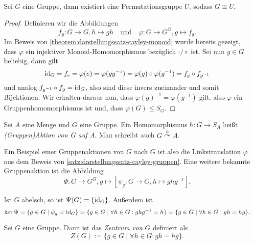 \begin{theorem}\label{satz:darstellungssatz-cayley-gruppen}
    Sei $G$ eine Gruppe, dann existiert eine Permutationsgruppe $U$, sodass $G \cong U$.
\end{theorem}
\begin{proof}
    Definieren wir die Abbildungen $$f_g: G \to G, h \mapsto gh \quad\text{und}\quad \varphi: G \to G^G, g \mapsto f_g.$$
    Im Beweis von \cref{theorem:darstellungssatz-cayley-monoid} wurde bereits gezeigt, dass $\varphi$ ein injektiver Monoid-Homomorphismus bezüglich $\cdot / \circ$ ist. Sei nun $g \in G$ beliebig, dann gilt $$ \operatorname{id}_G = f_e = \varphi(e) = \varphi(g g^{-1}) = \varphi(g) \circ \varphi(g^{-1}) = f_g \circ f_{g^{-1}}$$
    und analog $f_{g^{-1}} \circ f_g = \operatorname{id}_G$, also sind diese invers zueinander und somit Bijektionen. Wir erhalten daraus nun, dass $\varphi(g)^{-1} = \varphi(g^{-1})$ gilt, also $\varphi$ ein Gruppenhomomorphismus ist und, dass $\varphi(G) \le S_G$.
\end{proof}

\begin{definition}
    Sei $A$ eine Menge und $G$ eine Gruppe. Ein Homomorphismus $h: G \to S_A$ heißt \emph{(Gruppen)Aktion von G auf A}. Man schreibt auch $G \overset{h}{\curvearrowright} A$.
\end{definition}

\begin{remark}
   Ein Beispiel einer Gruppenaktionen von $G$ nach $G$ ist also die Linkstranslation $\varphi$ aus dem Beweis von \cref{satz:darstellungssatz-cayley-gruppen}. Eine weitere bekannte Gruppenaktion ist die Abbildung
   \begin{equation*}
        \Psi: G \to G^G, g \mapsto [\psi_g: G \to G, h \mapsto ghg^{-1}]. \tag*{(Konjugation)}
   \end{equation*}

   Ist $G$ abelsch, so ist $\Psi(G) = \{\operatorname{id}_G\}$. Außerdem ist 
   $$ \ker \Psi = \{g \in G \mid \psi_g = \operatorname{id}_G\} = \{g \in G \mid \forall h \in G: ghg^{-1} = h\} = \{g \in G \mid \forall h \in G: gh = hg\}. $$
\end{remark}

\begin{definition}
    Sei $G$ eine Gruppe. Dann ist das \emph{Zentrum von $G$} definiert als
   $$ Z(G) := \{ g \in G \mid \forall h \in G: gh = hg\}. $$ 
\end{definition}

